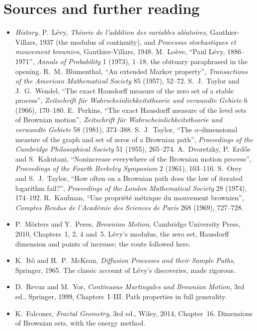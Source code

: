 \section*{Sources and further reading}

\begin{itemize}
\item \emph{History.} P.~L\'evy, \emph{Th\'eorie de l'addition des variables al\'eatoires}, Gauthier-Villars, 1937 (the modulus of continuity), and \emph{Processus stochastiques et mouvement brownien},
Gauthier-Villars, 1948. M.~Lo\`eve, ``Paul L\'evy, 1886--1971'', \emph{Annals of Probability} 1 (1973), 1--18, the obituary paraphrased in the opening. R.~M.~Blumenthal, ``An extended Markov property'',
\emph{Transactions of the American Mathematical Society} 85 (1957), 52--72. S.~J.~Taylor and J.~G.~Wendel, ``The exact Hausdorff measure of the zero set of a stable process'',
\emph{Zeitschrift f\"ur Wahrscheinlichkeitstheorie und verwandte Gebiete} 6 (1966), 170--180. E.~Perkins, ``The exact Hausdorff measure of the level sets of Brownian motion'', \emph{Zeitschrift f\"ur
Wahrscheinlichkeitstheorie und verwandte Gebiete} 58 (1981), 373--388. S.~J.~Taylor, ``The $\alpha$-dimensional measure of the graph and set of zeros of a Brownian path'', \emph{Proceedings of the Cambridge
Philosophical Society} 51 (1955), 265--274. A.~Dvoretzky, P.~Erd\H{o}s and S.~Kakutani, ``Nonincrease everywhere of the Brownian motion process'', \emph{Proceedings of the Fourth Berkeley Symposium} 2 (1961),
103--116. S.~Orey and S.~J.~Taylor, ``How often on a Brownian path does the law of iterated logarithm fail?'', \emph{Proceedings of the London Mathematical Society} 28 (1974), 174--192. R.~Kaufman, ``Une propri\'et\'e
m\'etrique du mouvement brownien'', \emph{Comptes Rendus de l'Acad\'emie des Sciences de Paris} 268 (1969), 727--728.
\item P.~M\"orters and Y.~Peres, \emph{Brownian Motion}, Cambridge University Press, 2010, Chapters~1, 2, 4 and~5. L\'evy's modulus, the zero set, Hausdorff dimension and points of increase; the route followed here.
\item K.~It\^o and H.~P.~McKean, \emph{Diffusion Processes and their Sample Paths}, Springer, 1965. The classic account of L\'evy's discoveries, made rigorous.
\item D.~Revuz and M.~Yor, \emph{Continuous Martingales and Brownian Motion}, 3rd ed., Springer, 1999, Chapters~I--III. Path properties in full generality.
\item K.~Falconer, \emph{Fractal Geometry}, 3rd ed., Wiley, 2014, Chapter~16. Dimensions of Brownian sets, with the energy method.
\end{itemize}

